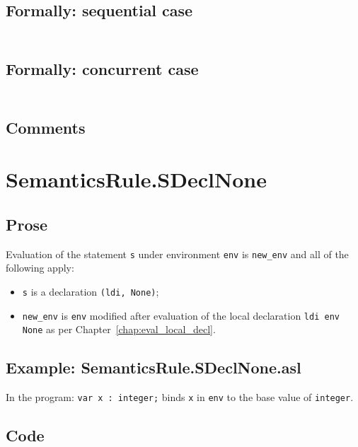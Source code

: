 \documentclass{book}
\begin{document}
  \subsection{Formally: sequential case}
  \begin{align}
  \end{align} 

  \subsection{Formally: concurrent case}
  \begin{align}
  \end{align} 

    \subsection{Comments}

\section{SemanticsRule.SDeclNone \label{sec:SemanticsRule.SDeclNone}}

    \subsection{Prose}
  Evaluation of the statement \texttt{s} under environment \texttt{env} is
\texttt{new\_env} and all of the following apply:
    \begin{itemize}
    \item \texttt{s} is a declaration \texttt{(ldi, None)};
    \item \texttt{new\_env} is \texttt{env} modified after evaluation of the local declaration
      \texttt{ldi env None} as per Chapter~\ref{chap:eval_local_decl}. 
    \end{itemize}

    \subsection{Example: SemanticsRule.SDeclNone.asl}
    In the program:
    \texttt{var x : integer;} binds \texttt{x} in \texttt{env} to the base value of \texttt{integer}.

  \subsection{Code}
\end{document}
